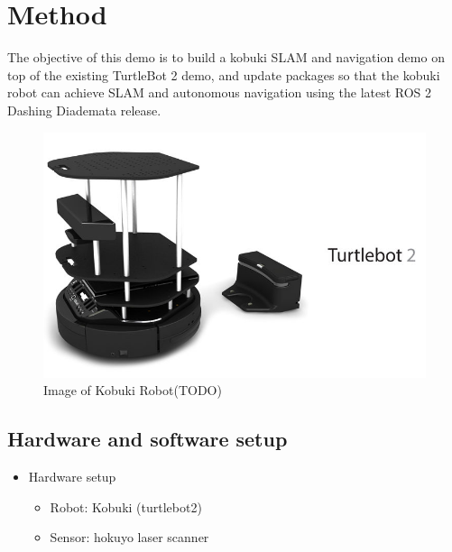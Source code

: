 \documentclass[letterpaper, 10 pt, conference]{ieeeconf}  %
\begin{document}
\section{Method}
The objective of this demo is to build a kobuki SLAM and navigation demo on top of the existing TurtleBot 2 demo, and update packages so that the kobuki robot can achieve SLAM and autonomous navigation using the latest ROS 2 Dashing Diademata release. 
 
\begin{figure}[ht]
  \includegraphics[width=\linewidth]{kobuki_image.jpg}
  \caption{Image of Kobuki Robot(TODO)} 
  \label{fig:Kobuki_image}
\end{figure}
\subsection{Hardware and software setup}
\begin{itemize}
\item  Hardware setup 
    \begin{itemize}
        \item Robot: Kobuki (turtlebot2)
        \item Sensor: hokuyo laser scanner
    \end{itemize}{}
\end{itemize}
\end{document}
